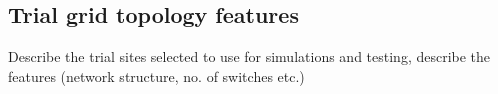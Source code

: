 \subsection{Trial grid topology features}
\label{sec:trial_grids}

Describe the trial sites selected to use for simulations and testing, describe the features (network structure, no. of switches etc.)

